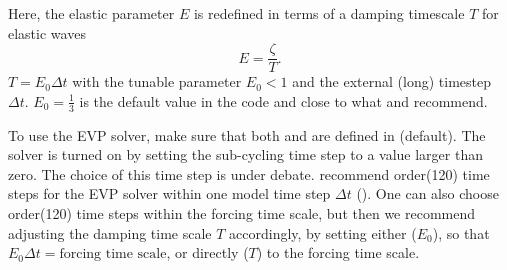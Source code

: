 Here, the elastic parameter $E$ is redefined in terms of a damping
timescale $T$ for elastic waves \[E=\frac{\zeta}{T}.\]
$T=E_{0}\Delta{t}$ with the tunable parameter $E_0<1$ and the external
(long) timestep $\Delta{t}$.  $E_{0} = \frac{1}{3}$ is the default
value in the code and close to what \citet{hun97} and
\citet{hun01} recommend.

To use the EVP solver, make sure that both  and
 are defined in 
(default). The solver is turned on by setting the sub-cycling time
step  to a value larger than zero. The
choice of this time step is under debate. \citet{hun97} recommend
order(120) time steps for the EVP solver within one model time step
$\Delta{t}$ (). One can also choose order(120) time
steps within the forcing time scale, but then we recommend adjusting
the damping time scale $T$ accordingly, by setting either
 ($E_{0}$), so that
$E_{0}\Delta{t}=\mbox{forcing time scale}$, or directly
 ($T$) to the forcing time scale.


